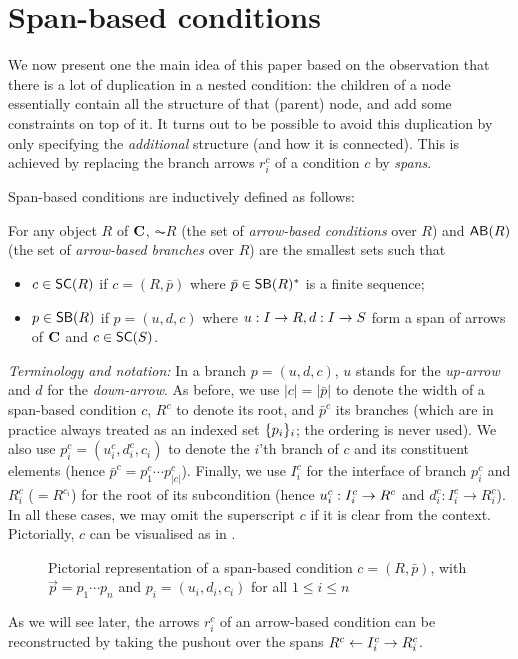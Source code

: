 \section{Span-based conditions}

We now present one the main idea of this paper based on the observation that there is a lot of duplication in a nested condition: the children of a node essentially contain all the structure of that (parent) node, and add some constraints on top of it. It turns out to be possible to avoid this duplication by only specifying the \emph{additional} structure (and how it is connected). This is achieved by replacing the branch arrows $r^c_i$ of a condition $c$ by \emph{spans}.

Span-based conditions are inductively defined as follows:

\begin{definition}
  For any object $R$ of $\mathbf{C}$, $\AC R$ (the set of \emph{arrow-based conditions} over $R$) and $\AB R$ (the set of \emph{arrow-based branches} over $R$) are the smallest sets such that
  \begin{itemize}
  \item $c\in \SC R$ if $c=(R,\bar p)$ where $\bar p\in \SB R^*$ is a finite sequence;
  \item $p\in \SB R$ if $p=(u,d,c)$ where $u: I\to R, d:I\rightarrow S$ form a span of arrows of $\mathbf{C}$ and $c\in \SC S$.
  \end{itemize}
\end{definition}
%
\emph{Terminology and notation:} In a branch $p=(u,d,c)$, $u$ stands for the \emph{up-arrow} and $d$ for the \emph{down-arrow}. As before, we use $|c|=|\bar p|$ to denote the width of a span-based condition $c$, $R^c$ to denote its root, and $\bar p^c$ its branches (which are in practice always treated as an indexed set $\{{p_i}\}_i$; the ordering is never used). We also use $p^c_i=(u^c_i,d^c_i,c_i)$ to denote the $i$'th branch of $c$ and its constituent elements (hence $\bar p^c=p^c_1\cdots p^c_{|c|}$). Finally, we use $I^c_i$ for the interface of branch $p^c_i$ and $R^c_i$ ($=R^{c_i}$) for the root of its subcondition (hence $u^c_i:I^c_i\rightarrow R^c$ and $d^c_i:I^c_i\rightarrow R^c_i$). In all these cases, we may omit the superscript $c$ if it is clear from the context. Pictorially, $c$ can be visualised as in .
%
\begin{figure}
  \centering
  
  \caption{Pictorial representation of a span-based condition $c=(R,\bar p)$, with $\vec p=p_1\cdots p_n$ and $p_i=(u_i,d_i,c_i)$ for all $1\leq i\leq n$}
\end{figure}
%
As we will see later, the arrows $r^c_i$ of an arrow-based condition can be reconstructed by taking the pushout over the spans $R^c\leftarrow I^c_i\rightarrow R^c_i$.


